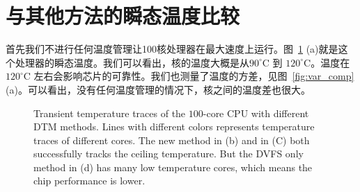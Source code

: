\section{与其他方法的瞬态温度比较}\label{sec:temp_comp}
首先我们不进行任何温度管理让100核处理器在最大速度上运行。图~\ref{fig:temp} (a)就是这个处理器的瞬态温度。我们可以看出，核的温度大概是从$90^{\circ}$C
到 $120^{\circ}$C。温度在$120^{\circ}$C 左右会影响芯片的可靠性。我们也测量了温度的方差，见图~\ref{fig:var_comp} (a)。可以看出，没有任何温度管理的情况下，核之间的温度差也很大。

\begin{figure}[H]
  \centering

  \caption{Transient temperature traces of the $100$-core
    CPU with different DTM methods. Lines with different colors
    represents temperature traces of different cores. The new method
    in (b) and \cite{MaWang:APCCAS'14} in (C) both successfully tracks
    the ceiling temperature. But the DVFS only method in (d) has many
    low temperature cores, which means the chip performance is lower.}\label{fig:temp}
\end{figure}
